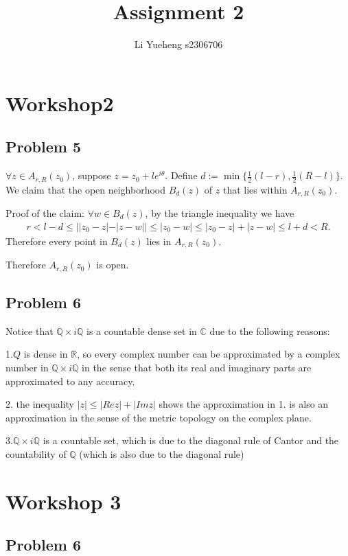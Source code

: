 \documentclass{article}
\begin{document}
\title{Assignment 2}
\author{Li Yueheng s2306706}

\maketitle

\section*{Workshop2}
\subsection*{Problem 5}


$\forall z \in A_{r,R}(z_0)$, suppose $z=z_0+le^{i\theta}$. Define $d:=\min\{{\frac{1}{2}(l-r),\frac{1}{2}(R-l) }\}$. We claim that the open neighborhood $B_d(z)$ of $z$ that lies within $A_{r,R}(z_0)$.

Proof of the claim: $\forall w\in B_{d}(z)$, by the triangle inequality we have
\begin{align*}
	r< l-d \leq ||z_0-z|-|z-w|| \leq|z_0-w|\leq |z_0-z|+|z-w|\leq l+d <R.
\end{align*}
Therefore every point in $B_d(z)$ lies in $A_{r,R}(z_0)$.

Therefore $A_{r,R}(z_0)$ is open.

\subsection*{Problem 6}
Notice that $\mathbb{Q}\times i\mathbb{Q}$ is a countable dense set in $\mathbb{C}$ due to the following reasons:

1.$Q$ is dense in $\mathbb{R}$, so every complex number can be approximated by a complex number in $\mathbb{Q}\times i\mathbb{Q}$ in the sense that both its real and imaginary parts are approximated to any accuracy.

2. the inequality $|z|\leq |Rez|+|Imz|$ shows the approximation in 1. is also an approximation in the sense of the metric topology on the complex plane.

3.$\mathbb{Q}\times i\mathbb{Q}$ is a countable set, which is due to the diagonal rule of Cantor and the countability of $\mathbb{Q}$ (which is also due to the diagonal rule)


\section*{Workshop 3}
\subsection*{Problem 6}
\end{document}
